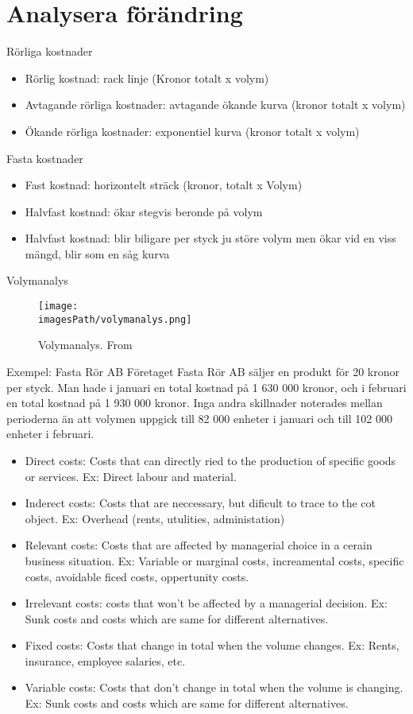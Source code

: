 \section{Analysera förändring}
Rörliga kostnader
\begin{itemize}
    \item Rörlig kostnad: rack linje (Kronor totalt x volym)
    \item Avtagande rörliga kostnader: avtagande ökande kurva (kronor totalt x volym)
    \item Ökande rörliga kostnader: exponentiel kurva (kronor totalt x volym)
\end{itemize}

Fasta kostnader 
\begin{itemize}
    \item Fast kostnad: horizontelt sträck (kronor, totalt x Volym)
    \item Halvfast kostnad: ökar stegvis beronde på volym
    \item Halvfast kostnad: blir biligare per styck ju störe volym men ökar vid en viss mängd, blir som en såg kurva
\end{itemize}

Volymanalys 
\begin{figure}[!ht]
    \centering
    \texttt{[image: \\imagesPath/volymanalys.png]}
    \caption{Volymanalys. From \cite{}}
\end{figure}

\begin{exampleblock}{Exempel: Fasta Rör AB}
    Företaget Fasta Rör AB säljer en produkt för 20 kronor per styck. Man hade i januari en 
    total kostnad på 1 630 000 kronor, och i februari en total kostnad på 1 930 000 kronor. Inga 
    andra skillnader noterades mellan perioderna än att volymen uppgick till 82 000 enheter i januari 
    och till 102 000 enheter i februari.
\end{exampleblock}

\begin{itemize}
    \item Direct costs: Costs that can directly ried to the production of specific goods or services.
    Ex: Direct labour and material.
    \item Inderect costs: Costs that are neccessary, but dificult to trace to the cot object. 
    Ex: Overhead (rents, utulities, administation)
    \item Relevant costs: Costs that are affected by managerial choice in a cerain business situation.
    Ex: Variable or marginal costs, increamental costs, specific costs, avoidable ficed costs, oppertunity costs.
    \item Irrelevant costs: costs that won't be affected by a managerial decision.
    Ex: Sunk costs and costs which are same for different alternatives.
    \item Fixed costs: Costs that change in total when the volume changes.
    Ex: Rents, insurance, employee salaries, etc.
    \item Variable costs: Costs that don't change in total when the volume is changing.
    Ex: Sunk costs and costs which are same for different alternatives.
\end{itemize}

